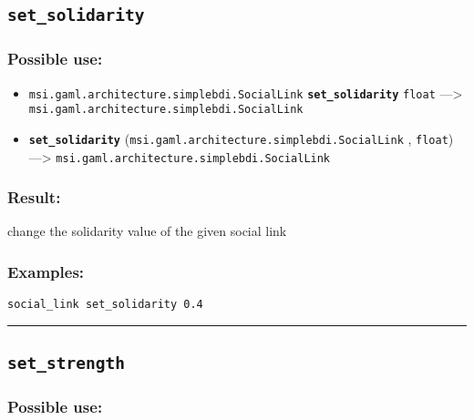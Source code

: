 \documentclass[]{book}
\providecommand{\tightlist}{%
  \setlength{\itemsep}{0pt}\setlength{\parskip}{0pt}}
\theoremstyle{definition}
\theoremstyle{definition}
\theoremstyle{definition}
\theoremstyle{remark}
\begin{document}
\subsection{\texorpdfstring{\texttt{set\_solidarity}}{set\_solidarity}}\label{set_solidarity}

\subsubsection{Possible use:}\label{possible-use-465}

\begin{itemize}
\tightlist
\item
  \texttt{msi.gaml.architecture.simplebdi.SocialLink}
  \textbf{\texttt{set\_solidarity}} \texttt{float} ---\textgreater{}
  \texttt{msi.gaml.architecture.simplebdi.SocialLink}
\item
  \textbf{\texttt{set\_solidarity}}
  (\texttt{msi.gaml.architecture.simplebdi.SocialLink} , \texttt{float})
  ---\textgreater{} \texttt{msi.gaml.architecture.simplebdi.SocialLink}
\end{itemize}

\subsubsection{Result:}\label{result-449}

change the solidarity value of the given social link

\subsubsection{Examples:}\label{examples-322}

\begin{verbatim}
social_link set_solidarity 0.4 
\end{verbatim}

\begin{center}\rule{0.5\linewidth}{\linethickness}\end{center}

\subsection{\texorpdfstring{\texttt{set\_strength}}{set\_strength}}\label{set_strength}

\subsubsection{Possible use:}\label{possible-use-466}
\end{document}
